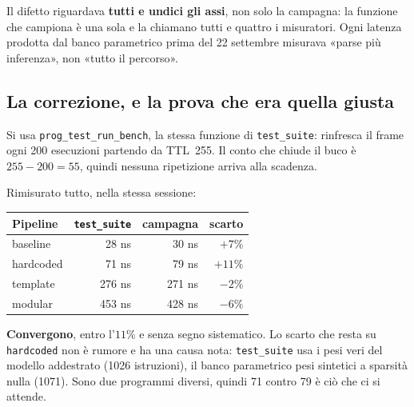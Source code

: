 \documentclass[11pt,a4paper,oneside]{report}
\begin{document}
\begin{lezione}
Il difetto riguardava \textbf{tutti e undici gli assi}, non solo la campagna:
la funzione che campiona è una sola e la chiamano tutti e quattro i
misuratori. Ogni latenza prodotta dal banco parametrico prima del 22 settembre
misurava «parse più inferenza», non «tutto il percorso».
\end{lezione}

\subsection*{La correzione, e la prova che era quella giusta}

Si usa \texttt{prog\_test\_run\_bench}, la stessa funzione di
\texttt{test\_suite}: rinfresca il frame ogni 200 esecuzioni partendo da
TTL~255. Il conto che chiude il buco è $255 - 200 = 55$, quindi nessuna
ripetizione arriva alla scadenza.

Rimisurato tutto, nella stessa sessione:

\begin{center}
\small
\begin{tabular}{@{}lrrr@{}}
\toprule
\textbf{Pipeline} & \textbf{\texttt{test\_suite}} & \textbf{campagna} &
\textbf{scarto} \\
\midrule
baseline   &  28 ns &  30 ns & $+7\%$ \\
hardcoded  &  71 ns &  79 ns & $+11\%$ \\
template   & 276 ns & 271 ns & $-2\%$ \\
modular    & 453 ns & 428 ns & $-6\%$ \\
\bottomrule
\end{tabular}
\end{center}

\textbf{Convergono}, entro l'$11\%$ e senza segno sistematico. Lo scarto che
resta su \texttt{hardcoded} non è rumore e ha una causa nota:
\texttt{test\_suite} usa i pesi veri del modello addestrato (1026 istruzioni),
il banco parametrico pesi sintetici a sparsità nulla (1071). Sono due
programmi diversi, quindi 71 contro 79 è ciò che ci si attende.
\end{document}
